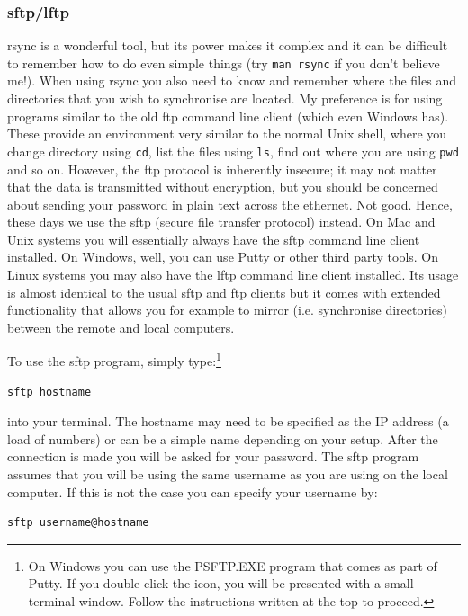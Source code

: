 \documentclass[11pt]{article}
\begin{document}
\subsubsection{sftp/lftp}
\label{sec:orgheadline12}
rsync is a wonderful tool, but its power makes it complex and it can be
difficult to remember how to do even simple things (try \texttt{man rsync} if
you don't believe me!). When using rsync you also need to know and
remember where the files and directories that you wish to synchronise
are located. My preference is for using
programs similar to the old ftp command line client (which even Windows has). 
These provide an
environment very similar to the normal Unix shell, where you change
directory using \texttt{cd}, list the files using \texttt{ls}, find out where you are
using \texttt{pwd} and so on. However, the ftp protocol is inherently insecure;
it may not matter that the data is transmitted without encryption, but
you should be concerned about sending your password in plain text
across the ethernet. Not good. Hence, these days we use the sftp (secure
file transfer protocol) instead. On Mac and Unix systems you will
essentially always have the sftp command line client installed. On
Windows, well, you can use Putty or other third party tools. On Linux
systems you may also have the lftp command line client installed. Its
usage is almost identical to the usual sftp and ftp clients but it comes
with extended functionality that allows you for example to mirror (i.e.
synchronise directories) between the remote and local computers.

To use the sftp program, simply type:\footnote{On Windows you can use the PSFTP.EXE program
that comes as part of Putty. If you double click the icon, you will be
presented with a small terminal window. Follow the instructions written
at the top to proceed.}

\begin{verbatim}
sftp hostname
\end{verbatim}

into your terminal. The hostname may need to be specified as the IP
address (a load of numbers) or can be a simple name depending on your
setup. After the connection is made you will be asked for your password.
The sftp program assumes that you will be using the same username as you
are using on the local computer. If this is not the case you can specify
your username by:

\begin{verbatim}
sftp username@hostname
\end{verbatim}
\end{document}
